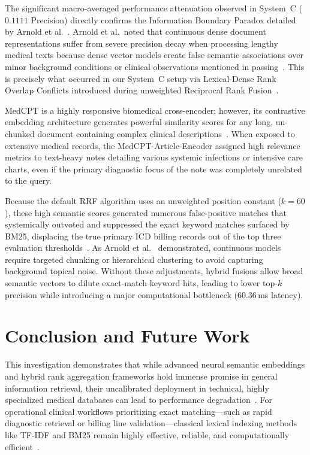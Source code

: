 \documentclass[conference]{IEEEtran}
\begin{document}
The significant macro-averaged performance attenuation observed in System~C ($0.1111$ Precision) directly confirms the Information Boundary Paradox detailed by Arnold et al.~\cite{arnold2020learning}. Arnold et al.\ noted that continuous dense document representations suffer from severe precision decay when processing lengthy medical texts because dense vector models create false semantic associations over minor background conditions or clinical observations mentioned in passing~\cite{agostinelli2024dense}. This is precisely what occurred in our System~C setup via Lexical-Dense Rank Overlap Conflicts introduced during unweighted Reciprocal Rank Fusion~\cite{cormack2009reciprocal}.

MedCPT is a highly responsive biomedical cross-encoder; however, its contrastive embedding architecture generates powerful similarity scores for any long, un-chunked document containing complex clinical descriptions~\cite{jin2023medcpt}. When exposed to extensive medical records, the MedCPT-Article-Encoder assigned high relevance metrics to text-heavy notes detailing various systemic infections or intensive care charts, even if the primary diagnostic focus of the note was completely unrelated to the query.

Because the default RRF algorithm uses an unweighted position constant ($k=60$), these high semantic scores generated numerous false-positive matches that systemically outvoted and suppressed the exact keyword matches surfaced by BM25, displacing the true primary ICD billing records out of the top three evaluation thresholds~\cite{cormack2009reciprocal}. As Arnold et al.~\cite{arnold2020learning} demonstrated, continuous models require targeted chunking or hierarchical clustering to avoid capturing background topical noise. Without these adjustments, hybrid fusions allow broad semantic vectors to dilute exact-match keyword hits, leading to lower top-$k$ precision while introducing a major computational bottleneck ($60.36$\,ms latency).

\section{Conclusion and Future Work}
This investigation demonstrates that while advanced neural semantic embeddings and hybrid rank aggregation frameworks hold immense promise in general information retrieval, their uncalibrated deployment in technical, highly specialized medical databases can lead to performance degradation~\cite{agostinelli2024dense}. For operational clinical workflows prioritizing exact matching---such as rapid diagnostic retrieval or billing line validation---classical lexical indexing methods like TF-IDF and BM25 remain highly effective, reliable, and computationally efficient~\cite{robertson2009probabilistic}.
\end{document}
